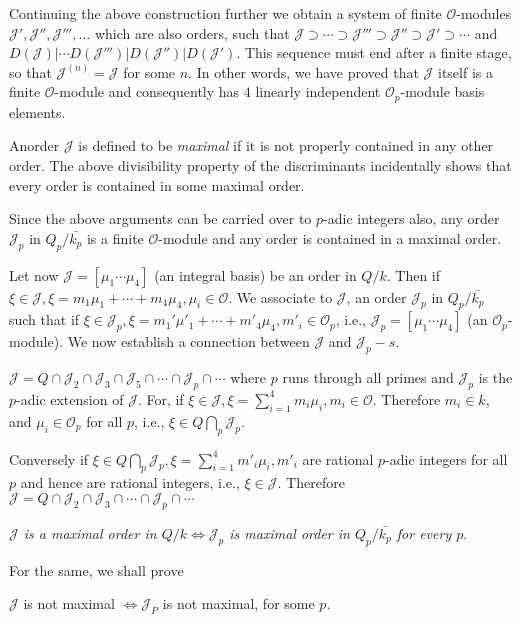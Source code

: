 Continuing the above construction further we obtain a system of finite
$\mathscr{O}$-modules $\mathcal{J}', \mathcal{J}'', \mathcal{J}''',
\ldots$ which are also orders, such that $\mathcal{J} \supset \cdots
\supset \mathcal{J}''' \supset \mathcal{J}'' \supset \mathcal{J}'
\supset \cdots$ and $D(\mathcal{J})|\cdots D(\mathcal{J}''')|
D(\mathcal{J}'')| D(\mathcal{J}')$. This sequence must end after a
finite stage, so that $\mathcal{J}^{(n)} = \mathcal{J}$ for some
$n$. In other words, we have proved that $\mathcal{J}$ itself is a
finite $\mathscr{O}$-module and consequently has $4$ linearly
independent $\mathscr{O}_p$-module basis elements. 

An\pageoriginale order $\mathcal{J}$ is defined to be \textit{maximal} if it is not
properly contained in any other order. The above divisibility property
of the discriminants incidentally shows that every order is contained
in some maximal order. 

Since the above arguments can be carried over to $p$-adic integers
also, any order $\mathcal{J}_p$ in $Q_p/ \bar{k_p}$ is a finite
$\mathscr{O}$-module and any order is contained in a maximal order. 

Let now $\mathcal{J} = [\mu_1 \cdots \mu_4]$ (an integral basis) be an
order in $Q/k$. Then if $\xi \in \mathcal{J}, \xi = m_1 \mu_1 + \cdots
+ m_4 \mu_4, \mu_i \in \mathscr{O}$. We associate to $\mathcal{J}$, an
order $\mathcal{J}_p$ in $Q_p/\bar{k_p}$ such that if $\xi \in
\mathcal{J}_p, \xi = m_1' \mu'_1 + \cdots + m'_4 \mu_4,  m'_i \in
\mathscr{O}_p$, i.e., $\mathcal{J}_p = [ \mu_1 \cdots \mu_4]$ (an
$\mathscr{O}_p$-module). We now establish a connection between
$\mathcal{J}$ and $\mathcal{J}_p - s$. 

$\mathcal{J} = Q \cap
\mathcal{J}_2 \cap \mathcal{J}_3 \cap \mathcal{J}_5 \cap \cdots \cap
\mathcal{J}_p \cap \cdots$ where $p$ runs through all primes and
$\mathcal{J}_p$ is the $p$-adic extension of $\mathcal{J}$. For, if
$\xi \in \mathcal{J},  \xi = \sum \limits^{4}_{i=1} m_i \mu_i,  m_i
\in \mathscr{O}$. Therefore $m_i \in k$, and $\mu_i\in \mathscr{O}_p$ for
all $p$, i.e., $\xi \in Q \bigcap \limits_p \mathcal{J}_p$. 

Conversely if $\xi \in Q \bigcap_p \mathcal{J}_p,  \xi = \sum
\limits^{4}_{i=1} m'_i \mu_i,  m'_i$ are rational $p$-adic integers
for all $p$ and hence are rational integers, i.e., $\xi \in
\mathcal{J}$. Therefore $\mathcal{J} = Q \cap \mathcal{J}_2 \cap
\mathcal{J}_3 \cap \cdots \cap\mathcal{J}_p \cap \cdots$ 
\begin{theorem}\label{chap1:sec2:thm3}%
  {\em $\mathcal{J}$ is a maximal order in $Q/k \Leftrightarrow
    \mathcal{J}_p$ is maximal order in $Q_p/\bar{k_p}$ for every $p$}. 
  
  For the same, we shall prove
  
  $\mathcal{J}$ is not maximal $\Leftrightarrow \mathcal{J}_P$ is not
  maximal, for some $p$. 
\end{theorem}

